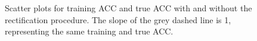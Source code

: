 \documentclass[12pt]{article}
\begin{document}
        \begin{figure}[htpb]
            \centering
            \caption{Scatter plots for training ACC and true ACC with and without the rectification procedure. The slope of the grey dashed line is 1, representing the same training and true ACC.}
            \label{fig:acc_scatter_w_wo_swap_label}
        \end{figure}
\end{document}
